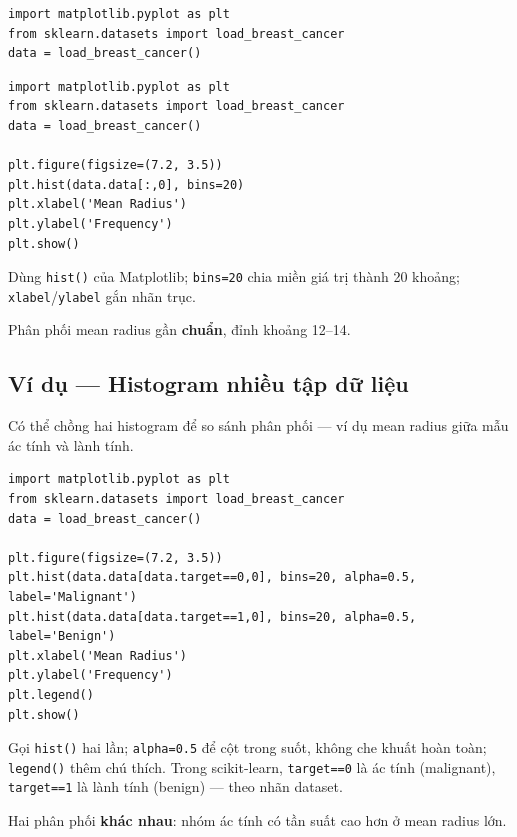 \begin{vidu}[title={Import và histogram mean radius}]
\begin{lstlisting}
import matplotlib.pyplot as plt
from sklearn.datasets import load_breast_cancer
data = load_breast_cancer()
\end{lstlisting}

\begin{lstlisting}
import matplotlib.pyplot as plt
from sklearn.datasets import load_breast_cancer
data = load_breast_cancer()

plt.figure(figsize=(7.2, 3.5))
plt.hist(data.data[:,0], bins=20)
plt.xlabel('Mean Radius')
plt.ylabel('Frequency')
plt.show()
\end{lstlisting}

Dùng \texttt{hist()} của Matplotlib; \texttt{bins=20} chia miền giá trị thành 20 khoảng; \texttt{xlabel}/\texttt{ylabel} gắn nhãn trục.
\end{vidu}

\begin{ynghia}[title={Đọc biểu đồ}]
Phân phối mean radius gần \textbf{chuẩn}, đỉnh khoảng 12--14.
\end{ynghia}

\begin{vidu}[title={Output}]
\end{vidu}

\subsection{Ví dụ --- Histogram nhiều tập dữ liệu}

\begin{ynghia}[title={So sánh hai nhóm}]
Có thể chồng hai histogram để so sánh phân phối --- ví dụ mean radius giữa mẫu ác tính và lành tính.
\end{ynghia}

\begin{vidu}[title={Hai histogram chồng nhau}]
\begin{lstlisting}
import matplotlib.pyplot as plt
from sklearn.datasets import load_breast_cancer
data = load_breast_cancer()

plt.figure(figsize=(7.2, 3.5))
plt.hist(data.data[data.target==0,0], bins=20, alpha=0.5, label='Malignant')
plt.hist(data.data[data.target==1,0], bins=20, alpha=0.5, label='Benign')
plt.xlabel('Mean Radius')
plt.ylabel('Frequency')
plt.legend()
plt.show()
\end{lstlisting}

Gọi \texttt{hist()} hai lần; \texttt{alpha=0.5} để cột trong suốt, không che khuất hoàn toàn; \texttt{legend()} thêm chú thích.
Trong scikit-learn, \texttt{target==0} là ác tính (malignant), \texttt{target==1} là lành tính (benign) --- theo nhãn dataset.
\end{vidu}

\begin{ynghia}[title={Nhận xét}]
Hai phân phối \textbf{khác nhau}: nhóm ác tính có tần suất cao hơn ở mean radius lớn.
\end{ynghia}

\begin{vidu}[title={Output}]
\end{vidu}
